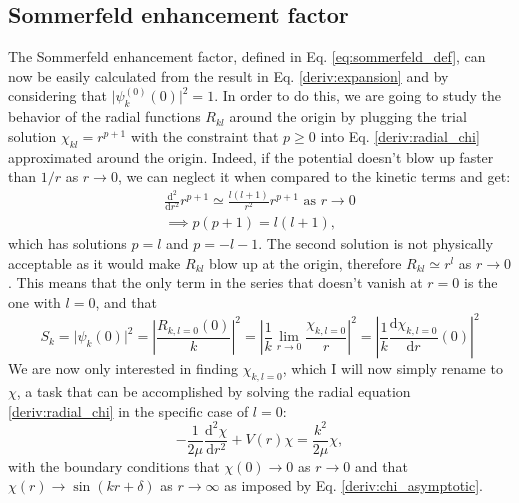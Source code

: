 \subsection{Sommerfeld enhancement factor}
The Sommerfeld enhancement factor, defined in Eq. \eqref{eq:sommerfeld_def}, can now be easily calculated from the result in Eq. \eqref{deriv:expansion} and by considering that \(\vert \psi_k^{(0)}(0) \vert^2=1 \). In order to do this, we are going to study the behavior of the radial functions \(R_{kl} \) around the origin by plugging the trial solution \(\chi_{kl} = r^{p+1} \) with the constraint that \(p\geq 0\) into Eq. \eqref{deriv:radial_chi} approximated around the origin. Indeed, if the potential doesn't blow up faster than \(1 / r\) as \(r \to 0\), we can neglect it when compared to the kinetic terms and get:
\begin{gather}
	\frac{\mathrm{d}^2}{\mathrm{d}r^2} r^{p+1} \simeq \frac{l(l+1)}{r^2}r^{p+1} \text{ as } r \to 0 \\
	\implies p(p+1)=l(l+1),
\end{gather}
which has solutions \(p=l\) and \(p=-l-1\). The second solution is not physically acceptable as it would make \(R_{kl} \) blow up at the origin, therefore \(R_{kl} \simeq r^l \) as \(r \to 0\). This means that the only term in the series that doesn't vanish at \(r=0\) is the one with \(l=0\), and that
\begin{equation}
	S_k=\vert \psi _k (0) \vert ^2 
	= \left\vert \frac{R_{k,l=0}(0)}{k} \right\vert ^2 
	= \left\vert \frac{1}{k}\lim_{r \to 0} \frac{\chi_{k,l=0}}{r} \right\vert ^2
	= \left\vert \frac{1}{k}\frac{\mathrm{d}\chi_{k,l=0}}{\mathrm{d}r} (0) \right\vert ^2
\end{equation}
We are now only interested in finding \(\chi_{k,l=0}\), which I will now simply rename to \(\chi \), a task that can be accomplished by solving the radial equation \eqref{deriv:radial_chi} in the specific case of \(l=0\):
\begin{equation}\label{deriv:goal_equation}
	-\frac{1}{2\mu } \frac{\mathrm{d}^2 \chi}{\mathrm{d}r^2} + V(r) \chi = \frac{k^2}{2\mu } \chi,
\end{equation}
with the boundary conditions that \(\chi (0) \to  0\) as \(r \to 0\) and that \(\chi (r) \to \sin (kr + \delta)\) as \(r \to \infty \) as imposed by Eq. \eqref{deriv:chi_asymptotic}.


